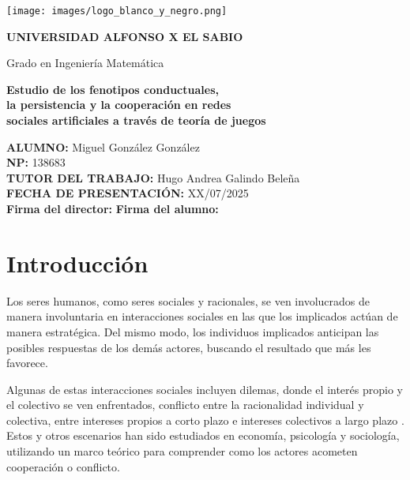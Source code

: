 \documentclass[a4paper,12pt]{report}
\begin{document}
\begin{titlepage}
    \thispagestyle{empty}
    \begin{center}
        \vspace*{-2.5cm}
        \texttt{[image: images/logo\_blanco\_y\_negro.png]}

        \vspace{1cm}
        {\bfseries\LARGE UNIVERSIDAD ALFONSO X EL SABIO}

        \vspace{1.5cm}
        {\large Grado en Ingeniería Matemática}

        \vspace{2.5cm}
        {\bfseries\Large
        Estudio de los fenotipos conductuales,\\
        la persistencia y la cooperación en redes\\
        sociales artificiales a través de teoría de juegos}
    \end{center}    
    \vspace{2.5cm}
    {\large \textbf{ALUMNO:} Miguel González González} \\[0.5cm]
    {\large \textbf{NP:} 138683} \\[0.5cm]
    {\large \textbf{TUTOR DEL TRABAJO:} Hugo Andrea Galindo Beleña} \\[0.5cm]        
    {\large \textbf{FECHA DE PRESENTACIÓN:} XX/07/2025} \\[2cm]        
    \textbf{Firma del director:}
    \hfill
    \textbf{Firma del alumno:}
\end{titlepage}


\newpage
\tableofcontents %

\newpage


\chapter{Introducción}

Los seres humanos, como seres sociales y racionales, se ven involucrados de manera involuntaria en interacciones sociales en las que los implicados actúan de manera estratégica. Del mismo modo, los individuos implicados anticipan las posibles respuestas de los demás actores, buscando el resultado que más les favorece.

Algunas de estas interacciones sociales incluyen dilemas, donde el interés propio y el colectivo se ven enfrentados, conflicto entre la racionalidad individual y colectiva, entre intereses propios a corto plazo e intereses colectivos a largo plazo \cite{dawes1980social,kollock1998social,vanLange2013psychology}. Estos y otros escenarios han sido estudiados en economía, psicología y sociología, utilizando un marco teórico para comprender como los actores acometen cooperación o conflicto.
\end{document}

